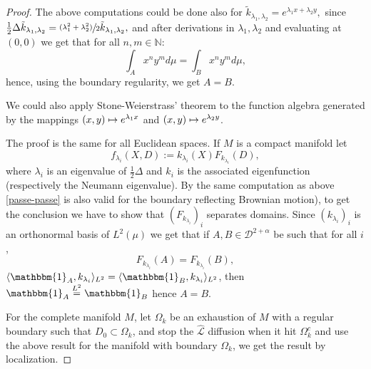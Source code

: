 \documentclass[JEP,XML,SOM,Unicode,NoFloatCountersInSection,published]{cedram}
\newcommand\mto{\mathchoice{\longmapsto}{\mapsto}{\mapsto}{\mapsto}}
\newcommand{\psfrac}[2]{\sfrac{(#1)}{#2}}
\theoremstyle{plain}
\theoremstyle{definition}
\newcommand{\SL}{{\mathscr L}}
\newcommand{\un}{\mathbbm{1}}
\let\a\alpha
\let\D\Delta
\newcommand{\cD}{\mathcal{D}}
\begin{document}
\begin{proof}
The above computations could be done also for $\tilde{k}_{\lambda_1,\lambda_2} = e^{\lambda_1 x + \lambda_2 y},$ since $\frac12 \D \tilde{k}_{\lambda_1,\lambda_2} = \psfrac{\lambda_1^2 + \lambda_2^2}{2} \tilde{k}_{\lambda_1,\lambda_2}, $ and after derivations in $\lambda_1,\lambda_2 $ and evaluating at $(0,0)$ we get that for all $n,m \in \mathbb{N}$:
\[
\int_A x^ny^m d\mu = \int_B x^ny^m d\mu,
\]
hence, using the boundary regularity, we get $A= B$.\par
{We could also apply Stone-Weierstrass' theorem to the function algebra generated by the mappings $(x,y)\mto e^{\lambda_1 x}$ and $(x,y)\mto e^{\lambda_2 y} $}.\par
The proof is the same for all Euclidean spaces.
If $M$ is a compact manifold
let
\[
f_{\lambda_i} (X,D):= k_{\lambda_i}(X) F_{k_{\lambda_i}}(D),
\]
where
$\lambda_i $ is an
eigenvalue of $\frac12 \D $ and $k_i$ is the associated eigenfunction (respectively the Neumann eigenvalue).
By the same computation as above \eqref{passe-passe} is also valid for the boundary reflecting Brownian motion), to get the conclusion we have to show that $ (F_{k_{\lambda_i}})_i $ separates domains.
Since $(k_{\lambda_i})_i$ is an orthonormal basis of $ L^2(\mu) $
we get that if $ A,B \in \cD^{2+\a}$ be such that for all $i$,
\[
F_{k_{\lambda_i}}(A) = F_{k_{\lambda_i}}(B),
\]
\ie $\langle \un_A,k_{\lambda_i} \rangle_{L^2} = \langle \un_B,k_{\lambda_i} \rangle_{L^2} $, then $\un_A \overset{L^2}= \un_B $
hence $A=B$.

For the complete manifold $M$, let $ \Omega_k$ be an exhaustion of $M$ with a regular boundary such that $ D_0 \subset \Omega_k$, and stop the $\widehat{\SL} $ diffusion when it hit $\Omega_k^c$ and use the above result for the manifold with boundary $\Omega_k $, we get the result by localization.
\end{proof}
\end{document}
